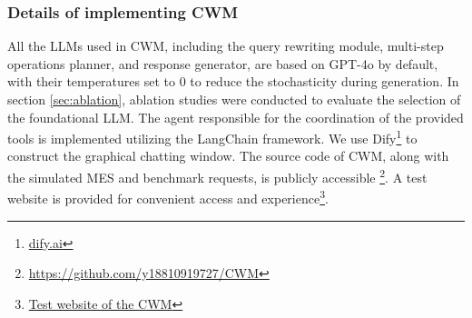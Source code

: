 \documentclass[preprint,12pt]{elsarticle}
\begin{document}
\subsubsection{Details of implementing CWM}
All the LLMs used in CWM, including the query rewriting module, multi-step operations planner, and response generator, are based on GPT-4o by default, with their temperatures set to 0 to reduce the stochasticity during generation.
In section \ref{sec:ablation}, ablation studies were conducted to evaluate the selection of the foundational LLM. 
The agent responsible for the coordination of the provided tools is implemented utilizing the LangChain framework. 
We use Dify\footnote{\href{https://github.com/langgenius/dify}{dify.ai}} to construct the graphical chatting window.
The source code of CWM, along with the simulated MES and benchmark requests, is publicly accessible \footnote{\href{https://github.com/y18810919727/CWM}{https://github.com/y18810919727/CWM}}.
A test website is provided for convenient access and experience\footnote{\href{https://dify.ai-fashion.cn/chat/muYb1xmFOw50PPWM}{Test website of the CWM}}.






\end{document}
